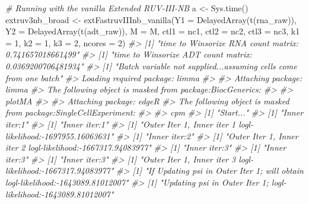 \documentclass[]{article}
\newcommand{\hlnum}[1]{\textcolor[rgb]{0.816,0.125,0.439}{#1}}%
\newcommand{\hlcom}[1]{\textcolor[rgb]{0.502,0.502,0.502}{\textit{#1}}}%
\newcommand{\hlstd}[1]{\textcolor[rgb]{0.251,0.251,0.251}{#1}}%
\newenvironment{Shaded}{\begin{myshaded}}{\end{myshaded}}
\newcommand{\DecValTok}[1]{\hlnum{#1}}
\newcommand{\CommentTok}[1]{\hlcom{#1}}
\newcommand{\OtherTok}[1]{{#1}}
\newcommand{\FunctionTok}[1]{\hlstd{#1}}
\newcommand{\AttributeTok}[1]{{#1}}
\newcommand{\NormalTok}[1]{\hlstd{#1}}
\begin{document}
\begin{Shaded}
\begin{Highlighting}[]
\CommentTok{\# Running with the vanilla Extended RUV{-}III{-}NB}
\NormalTok{a }\OtherTok{\textless{}{-}} \FunctionTok{Sys.time}\NormalTok{()}
\NormalTok{extruv3nb\_broad }\OtherTok{\textless{}{-}} \FunctionTok{extFastruvIIInb\_vanilla}\NormalTok{(}\AttributeTok{Y1 =} \FunctionTok{DelayedArray}\NormalTok{(}\FunctionTok{t}\NormalTok{(rna\_raw)),}
    \AttributeTok{Y2 =} \FunctionTok{DelayedArray}\NormalTok{(}\FunctionTok{t}\NormalTok{(adt\_raw)), }\AttributeTok{M =}\NormalTok{ M, }\AttributeTok{ctl1 =}\NormalTok{ nc1, }\AttributeTok{ctl2 =}\NormalTok{ nc2,}
    \AttributeTok{ctl3 =}\NormalTok{ nc3, }\AttributeTok{k1 =} \DecValTok{1}\NormalTok{, }\AttributeTok{k2 =} \DecValTok{1}\NormalTok{, }\AttributeTok{k3 =} \DecValTok{2}\NormalTok{, }\AttributeTok{ncores =} \DecValTok{2}\NormalTok{)}
\CommentTok{\#\textgreater{} [1] "time to Winsorize RNA count matrix: 0.741657018661499"}
\CommentTok{\#\textgreater{} [1] "time to Winsorize ADT count matrix: 0.0369200706481934"}
\CommentTok{\#\textgreater{} [1] "Batch variable not supplied...assuming cells come from one batch"}
\CommentTok{\#\textgreater{} Loading required package: limma}
\CommentTok{\#\textgreater{} }
\CommentTok{\#\textgreater{} Attaching package: \textquotesingle{}limma\textquotesingle{}}
\CommentTok{\#\textgreater{} The following object is masked from \textquotesingle{}package:BiocGenerics\textquotesingle{}:}
\CommentTok{\#\textgreater{} }
\CommentTok{\#\textgreater{}     plotMA}
\CommentTok{\#\textgreater{} }
\CommentTok{\#\textgreater{} Attaching package: \textquotesingle{}edgeR\textquotesingle{}}
\CommentTok{\#\textgreater{} The following object is masked from \textquotesingle{}package:SingleCellExperiment\textquotesingle{}:}
\CommentTok{\#\textgreater{} }
\CommentTok{\#\textgreater{}     cpm}
\CommentTok{\#\textgreater{} [1] "Start..."}
\CommentTok{\#\textgreater{} [1] "Inner iter:1"}
\CommentTok{\#\textgreater{} [1] "Inner iter:1"}
\CommentTok{\#\textgreater{} [1] "Outer Iter 1, Inner iter 1 logl{-}likelihood:{-}1697955.16063631"}
\CommentTok{\#\textgreater{} [1] "Inner iter:2"}
\CommentTok{\#\textgreater{} [1] "Outer Iter 1, Inner iter 2 logl{-}likelihood:{-}1667317.94083977"}
\CommentTok{\#\textgreater{} [1] "Inner iter:3"}
\CommentTok{\#\textgreater{} [1] "Inner iter:3"}
\CommentTok{\#\textgreater{} [1] "Inner iter:3"}
\CommentTok{\#\textgreater{} [1] "Outer Iter 1, Inner iter 3 logl{-}likelihood:{-}1667317.94083977"}
\CommentTok{\#\textgreater{} [1] "If Updating psi in Outer Iter 1; will obtain logl{-}likelihood:{-}1643089.81012007"}
\CommentTok{\#\textgreater{} [1] "Updating psi in Outer Iter 1; logl{-}likelihood:{-}1643089.81012007"}

\end{Highlighting}
\end{Shaded}
\end{document}
